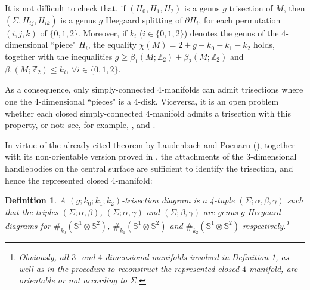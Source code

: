 \documentclass[12pt,a4paper]{article}
\newtheorem{definition}{Definition}
\begin{document}
\smallskip 

It is not difficult to check that, if $(H_0, H_1, H_2)$ is a genus $g$ trisection of $M$, then $(\Sigma, H_{ij}, H_{ik})$ is a genus $g$ Heegaard splitting of $\partial H_i$, for each permutation $(i,j,k)$ of $\{0,1,2\}$.  
Moreover,  if $k_i$ ($i \in \{0,1,2\}$) denotes the genus of the $4$-dimensional ``piece" $H_i$, the equality $\chi(M)= 2+g-k_0-k_1-k_2$ holds, together with the inequalities $g \ge \beta_1(M; \mathbb Z_2) + \beta_2(M; \mathbb Z_2)$ and $\beta_1(M; \mathbb Z_2) \le k_i$, $\forall i \in \{0,1,2\}$. 

As a consequence, only simply-connected $4$-manifolds can admit trisections where one the $4$-dimensional ``pieces" is a $4$-disk. Viceversa, it is an open problem whether each closed simply-connected $4$-manifold admits a trisection with this property, or not: see, for example, \cite{Meier}, \cite{Lambert-Cole-Meier} and \cite{Meier-Schirmer-Zupan}. 

\bigskip
In virtue of the already cited theorem by Laudenbach and Poenaru (\cite{Laudenbach-Poenaru}), together with its non-orientable version proved in \cite{Miller-Naylor}, the attachments of the 3-dimensional handlebodies on the central surface are sufficient to identify the trisection, and hence the represented closed $4$-manifold: 
 
\begin{definition} \label{def. trisection-diagram}  {\em A $(g; k_0; k_1; k_2)$-{\it trisection diagram} is a 4-tuple $(\Sigma; \alpha, \beta,\gamma)$ such that the triples $(\Sigma; \alpha, \beta)$, $(\Sigma; \alpha, \gamma)$ and $(\Sigma; \beta,\gamma)$ are genus $g$ Heegaard diagrams for $\#_{k_0}(\mathbb S^1 \otimes \mathbb S^2)$, $\#_{k_1}(\mathbb S^1 \otimes \mathbb S^2)$ and $\#_{k_2}(\mathbb S^1 \otimes \mathbb S^2)$ respectively.\footnote{Obviously, all $3$- and $4$-dimensional manifolds involved in Definition \ref{def. trisection-diagram}, as well as in the procedure to reconstruct the represented closed $4$-manifold, are orientable or not according to $\Sigma$.}  }
\end{definition}  
\end{document}
